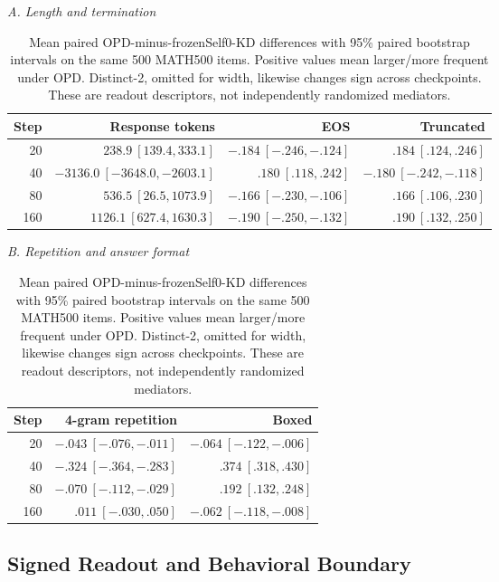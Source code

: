 \documentclass[letterpaper]{article} %
\begin{document}
\begin{table}[t]
\centering
\small
\begin{minipage}[t]{0.615\textwidth}
\centering
\textit{A. Length and termination}\\[2pt]
\setlength{\tabcolsep}{2.5pt}
\begin{tabular}{@{}rrrr@{}}
\toprule
Step & Response tokens & EOS & Truncated \\
\midrule
20 & $238.9\ [139.4,333.1]$ & $-.184\ [-.246,-.124]$ & $.184\ [.124,.246]$ \\
40 & $-3136.0\ [-3648.0,-2603.1]$ & $.180\ [.118,.242]$ & $-.180\ [-.242,-.118]$ \\
80 & $536.5\ [26.5,1073.9]$ & $-.166\ [-.230,-.106]$ & $.166\ [.106,.230]$ \\
160 & $1126.1\ [627.4,1630.3]$ & $-.190\ [-.250,-.132]$ & $.190\ [.132,.250]$ \\
\bottomrule
\end{tabular}
\end{minipage}\hfill
\begin{minipage}[t]{0.38\textwidth}
\centering
\textit{B. Repetition and answer format}\\[2pt]
\setlength{\tabcolsep}{2.5pt}
\begin{tabular}{@{}rrr@{}}
\toprule
Step & 4-gram repetition & Boxed \\
\midrule
20 & $-.043\ [-.076,-.011]$ & $-.064\ [-.122,-.006]$ \\
40 & $-.324\ [-.364,-.283]$ & $.374\ [.318,.430]$ \\
80 & $-.070\ [-.112,-.029]$ & $.192\ [.132,.248]$ \\
160 & $.011\ [-.030,.050]$ & $-.062\ [-.118,-.008]$ \\
\bottomrule
\end{tabular}
\end{minipage}
\caption{Mean paired OPD-minus-frozenSelf0-KD differences with 95\% paired bootstrap
intervals on the same 500 MATH500 items. Positive values mean larger/more frequent under
OPD. Distinct-2, omitted for width, likewise changes sign across checkpoints. These are
readout descriptors, not independently randomized mediators.}
\label{tab:supp-refresh-ci}
\end{table}

\subsection{Signed Readout and Behavioral Boundary}
\end{document}
